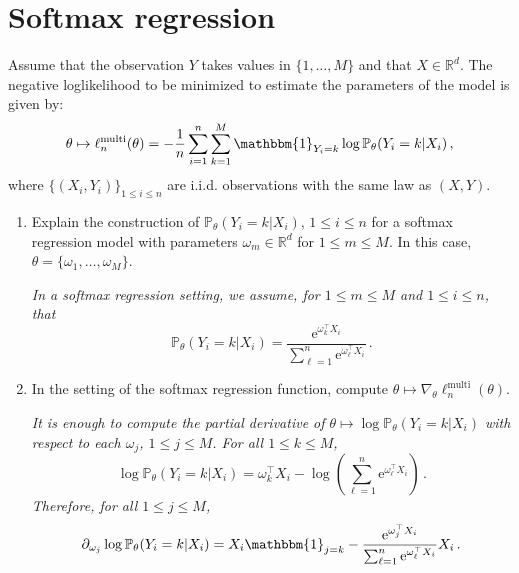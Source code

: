 \documentclass[a4paper,10pt,fleqn]{article}
\newcommand{\eqsp}{\,}
\newcommand{\1}{\ensuremath{\mathbbm{1}}}
\begin{document}
\section{Softmax regression}
Assume that the observation $Y$ takes values in $\{1,\ldots,M\}$ and that $X\in\mathbb{R}^d$. The negative loglikelihood to be minimized to estimate the parameters of the model is given by:
$$
\theta \mapsto \ell^{\mathrm{multi}}_n(\theta)= -\frac{1}{n} \sum_{i=1}^n\sum_{k=1}^{M} \1_{Y_i=k}\log \mathbb{P}_{\theta}(Y_i = k | X_i)\,,
$$
where $\{(X_i,Y_i)\}_{1\leqslant i\leqslant n}$ are i.i.d. observations with the same law as $(X,Y)$. 

\begin{enumerate}
\item Explain the construction of $\mathbb{P}_{\theta}(Y_i = k | X_i)$, $1\leqslant i\leqslant n$ for a softmax regression model with parameters $\omega_m\in\mathbb{R}^d$ for $1\leqslant m  \leqslant M$. In this case, $\theta = \{\omega_1,\ldots,\omega_M\}$.

\vspace{.2cm}

{\em
In a softmax regression setting, we assume, for $1\leqslant m  \leqslant M$ and $1\leqslant i  \leqslant n$, that
$$
\mathbb{P}_{\theta}(Y_i = k | X_i) = \frac{\mathrm{e}^{\omega_k^\top X_i}}{\sum_{\ell=1}^{n}\mathrm{e}^{\omega_\ell^\top X_i}}\eqsp.
$$
}
\item In the setting  of the softmax regression function, compute $\theta \mapsto \nabla_\theta \ell^{\mathrm{multi}}_n(\theta)$.

\vspace{.2cm}

{\em
It is enough to compute the partial derivative of $\theta \mapsto\log \mathbb{P}_{\theta}(Y_i = k | X_i)$ with respect to each $\omega_j$, $1\leqslant j\leqslant M$. For all $1\leqslant k\leqslant M$,
$$
\log \mathbb{P}_{\theta}(Y_i = k | X_i) = \omega_k^\top X_i - \log \left(\sum_{\ell=1}^{n}\mathrm{e}^{\omega_\ell^\top X_i}\right)\eqsp.
$$
Therefore, for all $1\leqslant j\leqslant M$,
$$
\partial_{\omega_j}\log \mathbb{P}_{\theta}(Y_i = k | X_i) = X_i \1_{j=k} - \frac{\mathrm{e}^{\omega_j^\top X_i}}{\sum_{\ell=1}^{n}\mathrm{e}^{\omega_\ell^\top X_i}}X_i\eqsp.
$$
}
\end{enumerate}
\end{document}
